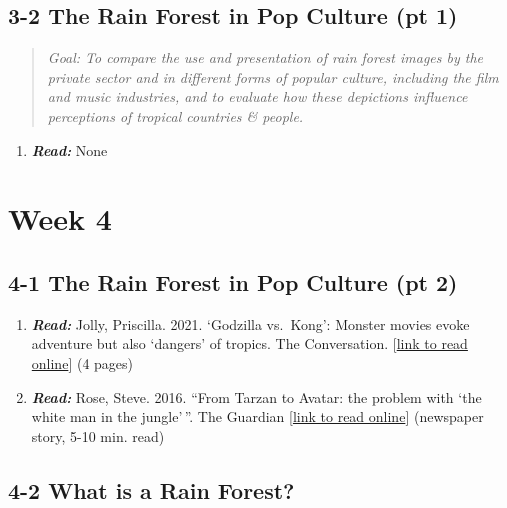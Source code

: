 \documentclass[
  10pt,
  letterpaper,
  oneside,
  open=any]{scrbook}
\providecommand{\tightlist}{%
  \setlength{\itemsep}{0pt}\setlength{\parskip}{0pt}}\usepackage{longtable,booktabs,array}
\begin{document}
\subsection*{3-2 The Rain Forest in Pop Culture (pt
1)}\label{the-rain-forest-in-pop-culture-pt-1}

\begin{quote}
\emph{Goal: To compare the use and presentation of rain forest images by
the private sector and in different forms of popular culture, including
the film and music industries, and to evaluate how these depictions
influence perceptions of tropical countries \& people.}
\end{quote}

\begin{enumerate}
\def\labelenumi{\arabic{enumi}.}
\tightlist
\item
  \textbf{\emph{Read:}} None
\end{enumerate}

\section{Week 4}\label{week-4}

\subsection*{4-1 The Rain Forest in Pop Culture (pt
2)}\label{the-rain-forest-in-pop-culture-pt-2}

\begin{enumerate}
\def\labelenumi{\arabic{enumi}.}
\item
  \textbf{\emph{Read:}} Jolly, Priscilla. 2021. `Godzilla vs.~Kong':
  Monster movies evoke adventure but also `dangers' of tropics. The
  Conversation.
  {[}\href{https://theconversation.com/godzilla-vs-kong-monster-movies-evoke-adventure-but-also-dangers-of-tropics-158105}{link
  to read online}{]} (4 pages)
\item
  \textbf{\emph{Read:}} Rose, Steve. 2016. ``From Tarzan to Avatar: the
  problem with `the white man in the jungle'\,''. The Guardian
  {[}\href{https://www.theguardian.com/film/2016/jul/06/why-the-white-man-in-the-jungle-film-wont-die}{link
  to read online}{]} (newspaper story, 5-10 min. read)
\end{enumerate}

\subsection*{4-2 What is a Rain Forest?}\label{what-is-a-rain-forest}
\end{document}
